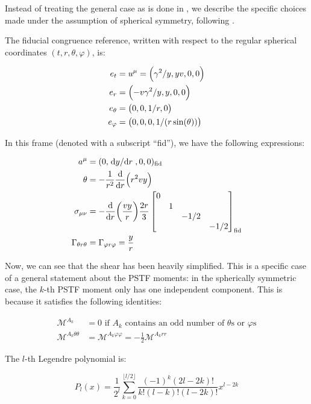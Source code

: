 \documentclass[main.tex]{subfiles}
\begin{document}
Instead of treating the general case as is done in \cite[]{Thorne:1981feb}, we describe the specific choices made under the assumption of spherical symmetry, following \cite[]{ThorneFLammmangZytkow:1981feb}.

The fiducial congruence reference, written with respect to the regular spherical coordinates \((t, r, \theta, \varphi)\), is:

\begin{subequations}
\begin{align}
  e_t &= u^\mu = \qty(\gamma^2 / y, yv, 0,0)  \\
  e_r &= \qty(-v \gamma^2 /y, y, 0, 0) \\
  e_\theta &= \qty(0,0, 1/r, 0)  \\
  e_ \varphi &= \qty(0,0,0, 1/(r \sin(\theta)))
\end{align}
\end{subequations}

In this frame (denoted with a subscript ``fid''), we have the following expressions:

\begin{subequations}
\begin{align}
  a^\mu &= (0,\dv*{y}{r},0,0)_{\text{fid}} \\
  \theta &= - \frac{1}{r^2} \dv{}{r} \qty(r^2 v y)  \\
  \sigma_{\mu\nu} &= - \dv{}{r} \qty(\frac{vy}{r}) \frac{2r}{3} \begin{bmatrix}
  0   &   &   &  \\
     &  1 &   &  \\
     &   & -1/2  &  \\
     &   &   & -1/2
  \end{bmatrix} _{\text{fid}} \\
  \Gamma_{\theta r \theta} &= \Gamma_{\varphi r \varphi} = \frac{y}{r}
\end{align}
\end{subequations}

Now, we can see that the shear has been heavily simplified. This is a specific case of a general statement about the PSTF moments: in the spherically symmetric case, the \(k\)-th PSTF moment only has one independent component. This is because it satisfies the following identities:

\begin{subequations}
\begin{align}
  \mathscr M ^{A_k} &= 0 \text{ if } A_k \text{ contains an odd number of } \theta \text{s or } \varphi \text{s}  \label{eq:id1-pstf-spherically-symmetric}  \\
  \mathscr M ^{A_k \theta \theta} &= \mathscr M ^{A_k \varphi \varphi} = -\frac{1}{2} \mathscr M ^{A_k rr} \label{eq:id2-pstf-spherically-symmetric}
\end{align}
\end{subequations}

The \(l\)-th Legendre polynomial is:

\begin{equation}
    P_{l}(x)=\frac{1}{2^{l}} \sum_{k=0}^{\lfloor l / 2\rfloor} \frac{(-1)^{k}(2 l-2 k) !}{k !(l-k) !(l-2 k) !} x^{l-2 k}
\end{equation}
\end{document}
